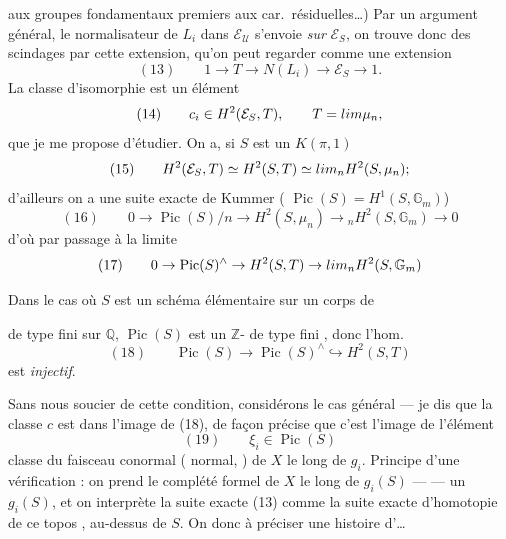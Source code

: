 \documentclass[11pt,a4paper]{article}
\begin{document}
aux groupes fondamentaux premiers aux car.\ résiduelles…) Par un argument général, le normalisateur de $L_i$ dans $\mathcal{E}_{\mathcal{U}}$ s'envoie \emph{sur} $\mathcal{E}_S$, on trouve donc des scindages par cette extension, qu'on peut regarder comme une extension
\[
(13)\qquad 1 \longrightarrow T \longrightarrow N(L_i) \longrightarrow \mathcal{E}_S \longrightarrow 1 .
\]
La classe d'isomorphie est un élément \struck{\ill{}}
\[
(14)\qquad c_i \in H^2(\mathcal{E}_S, T), \qquad T = \varprojlim \mu_n ,
\]
que je me propose d'étudier. On a, si $S$ est un $K(\pi, 1)$
\[
(15)\qquad H^2(\mathcal{E}_S, T) \simeq H^2(S, T) \simeq \varprojlim_n H^2(S, \mu_n) ;
\]
d'ailleurs on a une suite exacte de Kummer ( $\operatorname{Pic}(S) = H^1(S, \mathbb{G}_m)$)
\[
(16)\qquad 0 \to \operatorname{Pic}(S)/n \to H^2(S, \mu_n) \to {}_nH^2(S, \mathbb{G}_m) \to 0
\]
d'où par passage à la limite
\[
(17)\qquad 0 \to \operatorname{Pic}(S)^{\wedge} \to H^2(S, T) \to \varprojlim {}_nH^2(S, \mathbb{G}_m)
\]

Dans le cas où $S$ est un schéma élémentaire sur un corps de  \ill{}



de type fini sur $\mathbb{Q}$, $\operatorname{Pic}(S)$ est un $\mathbb{Z}$-  de type fini , donc l'hom.
\[
(18)\qquad \operatorname{Pic}(S) \longrightarrow \operatorname{Pic}(S)^{\wedge} \hookrightarrow H^2(S, T)
\]
est \emph{injectif}.

Sans nous soucier de cette condition,  considérons le cas général --- je dis que la classe \struck{\ill{}} $c$  est dans l'image de (18), de façon précise que c'est l'image de l'élément
\[
(19)\qquad \xi_i \in \operatorname{Pic}(S)
\]
classe du faisceau conormal ( normal,   ) de $X$ le long de $g_i$. Principe d'une vérification : on prend le complété formel de $X$ le long de $g_i(S)$ \struck{\ill{}} ---  --- un    $g_i(S)$, et on interprète la suite exacte (13) comme la suite exacte d'homotopie de ce  topos , au-dessus de \struck{\ill{}} $S$. On  donc à préciser une histoire d'…

\end{document}
